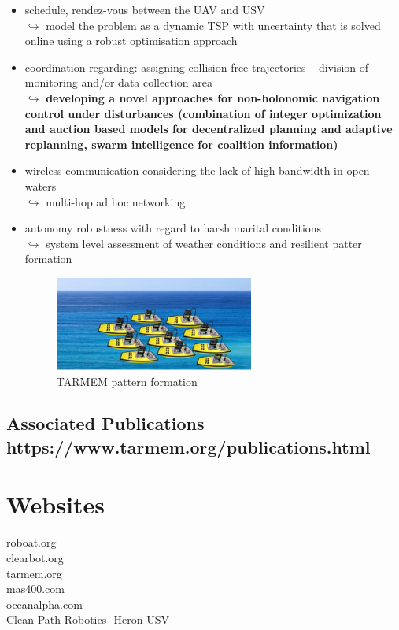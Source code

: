 \documentclass{article}
\begin{document}
\begin{itemize}
	\item schedule, rendez-vous between the UAV and USV \\
	$\hookrightarrow$ model the problem as a dynamic TSP with uncertainty that is solved online using a robust optimisation approach
	\item coordination regarding: assigning collision-free trajectories -- division of monitoring and/or data collection area \\
	$\hookrightarrow$ \textbf{developing a novel approaches for non-holonomic navigation control under disturbances (combination of integer optimization and auction based models for decentralized planning and adaptive replanning, swarm intelligence for coalition information)}
	\item wireless communication considering the lack of high-bandwidth in open waters \\
	$\hookrightarrow$ multi-hop ad hoc networking 
	\item autonomy robustness with regard to harsh marital conditions \\
	$\hookrightarrow$ system level assessment of weather conditions and resilient patter formation  
	
	\begin{figure}[htbp]
		\centerline{\includegraphics[scale=1]{tarmem-pattern-formation.png}}
		\caption{TARMEM pattern formation}
		\label{fig5}
	\end{figure}
	
\end{itemize} 

\subsection{Associated Publications https://www.tarmem.org/publications.html}




\section{Websites}

roboat.org \\
clearbot.org \\
tarmem.org \\
mas400.com \\
oceanalpha.com \\
Clean Path Robotics- Heron USV
\end{document}
